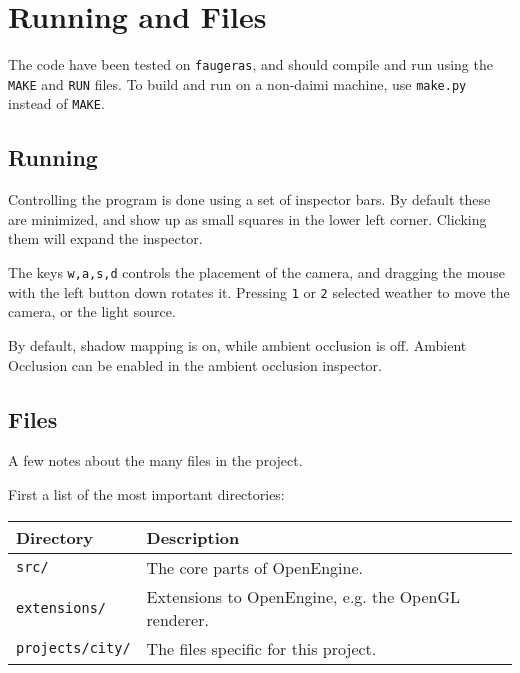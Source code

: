 
\section{Running and Files}

The code have been tested on \texttt{faugeras}, and should compile and
run using the \texttt{MAKE} and \texttt{RUN} files. To build and run
on a non-daimi machine, use \texttt{make.py} instead of \texttt{MAKE}.



\subsection{Running}

Controlling the program is done using a set of inspector bars. By
default these are minimized, and show up as small squares in the lower
left corner. Clicking them will expand the inspector.

The keys \texttt{w,a,s,d} controls the placement of the camera, and
dragging the mouse with the left button down rotates it. Pressing
\texttt{1} or \texttt{2} selected weather to move the camera, or the
light source.

By default, shadow mapping is on, while ambient occlusion is
off. Ambient Occlusion can be enabled in the ambient occlusion
inspector.

\subsection{Files}
\label{sec:files}
A few notes about the many files in the project.

First a list of the most important directories:

\begin{center} 
  \begin{tabular}{|l|l|}
    \hline 
    \textbf{Directory} & \textbf{Description} \\ \hline 
    \texttt{src/} & The core parts of OpenEngine. \\ \hline
    \texttt{extensions/} & Extensions to OpenEngine, e.g. the OpenGL renderer. \\ \hline
    \texttt{projects/city/} & The files specific for this project. \\ \hline
  \end{tabular}
\end{center}

